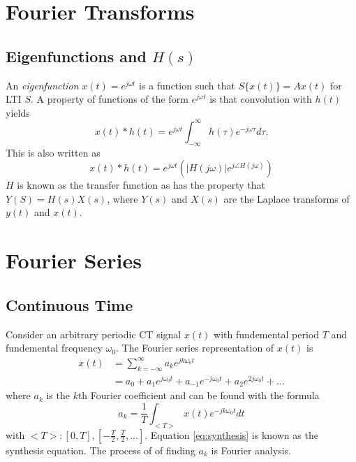 \section{Fourier Transforms} \label{sec:fourier}

\subsection{Eigenfunctions and $H(s)$}

An \emph{eigenfunction} $x(t) = e^{j\omega t}$ is a function such that
$S\{x(t)\} = Ax(t)$ for LTI $S$. A property of functions of the form
$e^{j\omega t}$ is that convolution with $h(t)$ yields
\begin{equation}
    x(t) * h(t) = e^{j\omega t} \int_{-\infty}^{\infty} h(\tau) e^{-j\omega \tau} d\tau.
\end{equation}
This is also written as
\begin{equation}
    x(t) * h(t) = e^{j\omega t} \left( |H(j\omega)|e^{j \angle H(j\omega)} \right)
\end{equation}
$H$ is known as the transfer function as has the property that
$Y(S) = H(s)X(s)$, where $Y(s)$ and $X(s)$ are the Laplace transforms
of $y(t)$ and $x(t)$.

\section{Fourier Series}

\subsection{Continuous Time}

Consider an arbitrary periodic CT signal $x(t)$ with fundemental
period $T$ and fundemental frequency $\omega_0$. The Fourier series
representation of $x(t)$ is
\begin{align}\label{eq:synthesis}
    x(t) & = \sum_{k=-\infty}^{\infty} a_k e^{jk\omega_0 t}                                  \\
         & = a_0 + a_1e^{j\omega_0 t} + a_{-1}e^{-j\omega_0 t} + a_2e^{2j\omega_0 t} + \dots
\end{align}
where $a_k$ is the $k$th Fourier coefficient and can be found with the formula
\begin{equation}
    a_k = \frac{1}{T} \int_{<T>} x(t) e^{-jk\omega_0 t} dt
\end{equation}
with $<T>: [0, T], [-\frac{T}{2}, \frac{T}{2}, ...]$.
Equation \ref{eq:synthesis} is known as the synthesis equation. The process of
of finding $a_k$ is Fourier analysis.

